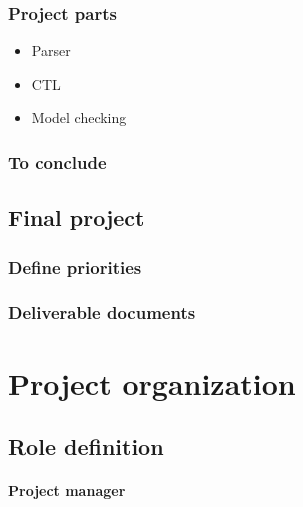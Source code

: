\documentclass{report}
\begin{document}
\subsection{Project parts}

\vspace{4mm}
\begin{itemize}
\item Parser\vspace{1mm}
\item CTL\vspace{1mm}
\item Model checking\vspace{1mm}
\end{itemize}

\subsection{To conclude}

\section{Final project}

\subsection{Define priorities}

\subsection{Deliverable documents}

\chapter{Project organization}

\section{Role definition}

\subsubsection{Project manager}

\paragraph{}
\hspace{4mm}\textnormal{}
\end{document}
